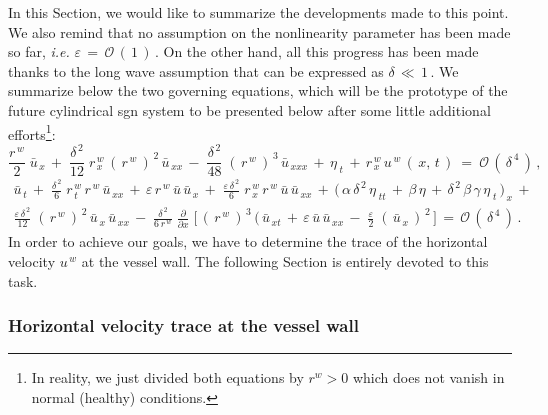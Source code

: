 \documentclass[alpha-refs, 12pt]{wiley-article}
\renewcommand{\O}{\mathcal{O}}
\newcommand{\eps}{\varepsilon}
\begin{document}
In this Section, we would like to summarize the developments made to this point. We also remind that no assumption on the nonlinearity parameter has been made so far, \emph{i.e.} $\eps\,=\,\O\,(\,1\,)\,$. On the other hand, all this progress has been made thanks to the long wave assumption that can be expressed as $\delta\, \ll \, 1\,$. We summarize below the two governing equations, which will be the prototype of the future cylindrical \acrshort{sgn} system to be presented below after some little additional efforts\footnote{In reality, we just divided both equations by $r^{w} > 0$ which does not vanish in normal (healthy) conditions.}:
\begin{equation}\label{eq:se1}
  \frac{r^{\,w}}{2}\;\bar{u}_{\,x}\,+\;\frac{\delta^{\,2}}{12}\;r^{\,w}_{\,x}\,(\,r^{\,w}\,)^{\,2}\,\bar{u}_{\,xx}\,-\;\frac{\delta^{\,2}}{48}\;(\,r^{\,w}\,)^{\,3}\,\bar{u}_{\,xxx}\,+\,\eta_{\;t}\,+\,r^{\,w}_{\,x}\,u^{\,w}\,(\,x,\,t\,)\ =\ \O\,(\,\delta^{\,4}\,)\,,
\end{equation}
\begin{multline}\label{eq:se2}
   \bar{u}_{\,t}\,+\;\frac{\delta^{\,2}}{6}\;r^{\,w}_{\,t}\,r^{\,w}\,\bar{u}_{\,xx}\,+\,\eps\, r^{\,w}\,\bar{u}\,\bar{u}_{\,x}\,+\;\frac{\eps\,\delta^{\,2}}{6}\;r^{\,w}_{\,x}\,r^{\,w}\,\bar{u}\,\bar{u}_{\,xx}\,+\,\bigl(\,\alpha\,\delta^{\,2}\,\eta_{\;tt}\,+\,\beta\,\eta\, + \,\delta^{\,2}\,\beta\,\gamma\,\eta_{\;t}\,\bigr)_{\,x}\, +\\
   \frac{\eps\,\delta^{\,2}}{12}\;(\,r^{\,w}\,)^{\,2}\,\bar{u}_{\,x}\,\bar{u}_{\,xx}\,-\;\frac{\delta^{\,2}}{6\,r^{\,w}}\;\frac{\partial}{\partial x}\;\biggl[ \,(\,r^{\,w}\,)^{\,3}\,(\,\bar{u}_{\,xt}\,+\,\eps\,\bar{u}\,\bar{u}_{\,xx}\,-\;\frac{\eps}{2}\;(\,\bar{u}_{\,x}\,)^{\,2}\,\biggr]\,=\,\O\,(\,\delta^{\,4}\,)\,.
\end{multline}
In order to achieve our goals, we have to determine the trace of the horizontal velocity $u^{\,w}$ at the vessel wall. The following Section is entirely devoted to this task.

\subsubsection{Horizontal velocity trace at the vessel wall}
\end{document}
